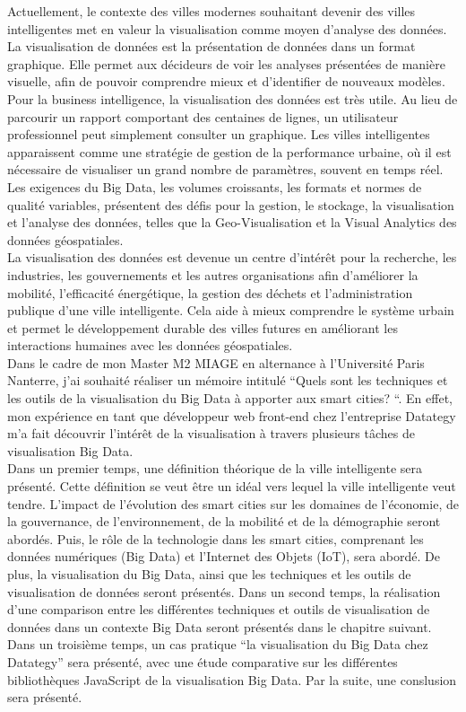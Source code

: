 \documentclass[french, a4paper, 12pt]{report}
\begin{document}
Actuellement, le contexte des villes modernes souhaitant devenir des villes intelligentes met en valeur la visualisation comme moyen d’analyse des données. La visualisation de données est la présentation de données dans un format graphique. Elle permet aux décideurs de voir les analyses présentées de manière visuelle, afin de pouvoir comprendre mieux et d’identifier de nouveaux modèles. Pour la business intelligence, la visualisation des données est très utile. Au lieu de parcourir un rapport comportant des centaines de lignes, un utilisateur professionnel peut simplement consulter un graphique. Les villes intelligentes apparaissent comme une stratégie de gestion de la performance urbaine, où il est nécessaire de visualiser un grand nombre de paramètres, souvent en temps réel. Les exigences du Big Data, les volumes croissants, les formats et normes de qualité variables, présentent des défis pour la gestion, le stockage, la visualisation et l'analyse des données, telles que la Geo-Visualisation et la Visual Analytics des données géospatiales. \\
La visualisation des données est devenue un centre d'intérêt pour la recherche, les industries, les gouvernements et les autres organisations afin d’améliorer la mobilité, l'efficacité énergétique, la gestion des déchets et l'administration publique d'une ville intelligente. Cela aide à mieux comprendre le système urbain et permet le développement durable des villes futures en améliorant les interactions humaines avec les données géospatiales.\\

Dans le cadre de mon Master M2 MIAGE en alternance à l’Université Paris Nanterre, j’ai souhaité réaliser un mémoire intitulé “Quels sont les techniques et les outils de la visualisation du Big Data à apporter aux smart cities? “. En effet, mon expérience en tant que développeur web front-end chez l’entreprise Datategy m’a fait découvrir l’intérêt de la visualisation à travers plusieurs tâches de visualisation Big Data.\\

Dans un premier temps, une définition théorique de la ville intelligente sera présenté. Cette définition se veut être un idéal vers lequel la ville intelligente veut tendre. L’impact de l'évolution des smart cities sur les domaines de l’économie, de la gouvernance, de l’environnement, de la mobilité et de la démographie seront abordés. Puis, le rôle de la technologie dans les smart cities, comprenant les données numériques (Big Data) et l’Internet des Objets (IoT), sera abordé. De plus, la visualisation du Big Data, ainsi que les techniques et les outils de visualisation de données seront présentés. 
Dans un second temps, la réalisation d’une comparison entre les différentes techniques et outils de visualisation de données dans un contexte Big Data seront présentés dans le chapitre suivant.
Dans un troisième temps, un cas pratique “la visualisation du Big Data chez Datategy” sera présenté, avec une étude comparative sur les différentes bibliothèques JavaScript de la visualisation Big Data. Par la suite, une conslusion sera présenté. 
\end{document}
